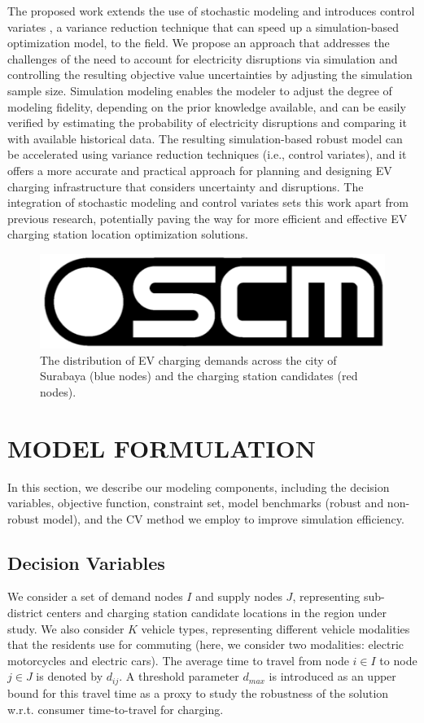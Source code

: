 \documentclass[preprint]{oscmjournal}
\theoremstyle{remark}
\begin{document}
The proposed work extends the use of stochastic modeling and introduces control variates \autocite{hesterberg1998control}, a variance reduction technique that can speed up a simulation-based optimization model, to the field. We propose an approach that addresses the challenges of the need to account for electricity disruptions via simulation and controlling the resulting objective value uncertainties by adjusting the simulation sample size. Simulation modeling enables the modeler to adjust the degree of modeling fidelity, depending on the prior knowledge available, and can be easily verified by estimating the probability of electricity disruptions and comparing it with available historical data. The resulting simulation-based robust model can be accelerated using variance reduction techniques (i.e., control variates), and it offers a more accurate and practical approach for planning and designing EV charging infrastructure that considers uncertainty and disruptions. The integration of stochastic modeling and control variates sets this work apart from previous research, potentially paving the way for more efficient and effective EV charging station location optimization solutions.





\begin{figure}
    \centering
    \includegraphics[width=0.5\linewidth]{figs/oscm.png}
    \caption{The distribution of EV charging demands across the city of Surabaya (blue nodes) and the charging station candidates (red nodes).}
    \label{fig:candidate_location}
\end{figure}



\section{MODEL FORMULATION}
\label{sec:problem_formulation}

In this section, we describe our modeling components, including the decision variables, objective function, constraint set, model benchmarks (robust and non-robust model), and the CV method we employ to improve simulation efficiency.

\subsection{Decision Variables}
 We consider a set of demand nodes $I$ and supply nodes $J$, representing sub-district centers and charging station candidate locations in the region under study. We also consider $K$ vehicle types, representing different vehicle modalities that the residents use for commuting (here, we consider two modalities: electric motorcycles and electric cars). The average time to travel from node $i \in I$ to node $j \in J$ is denoted by $d_{ij}$. A threshold parameter $d_{max}$ is introduced as an upper bound for this travel time as a proxy to study the robustness of the solution w.r.t. consumer time-to-travel for charging. 
\end{document}
